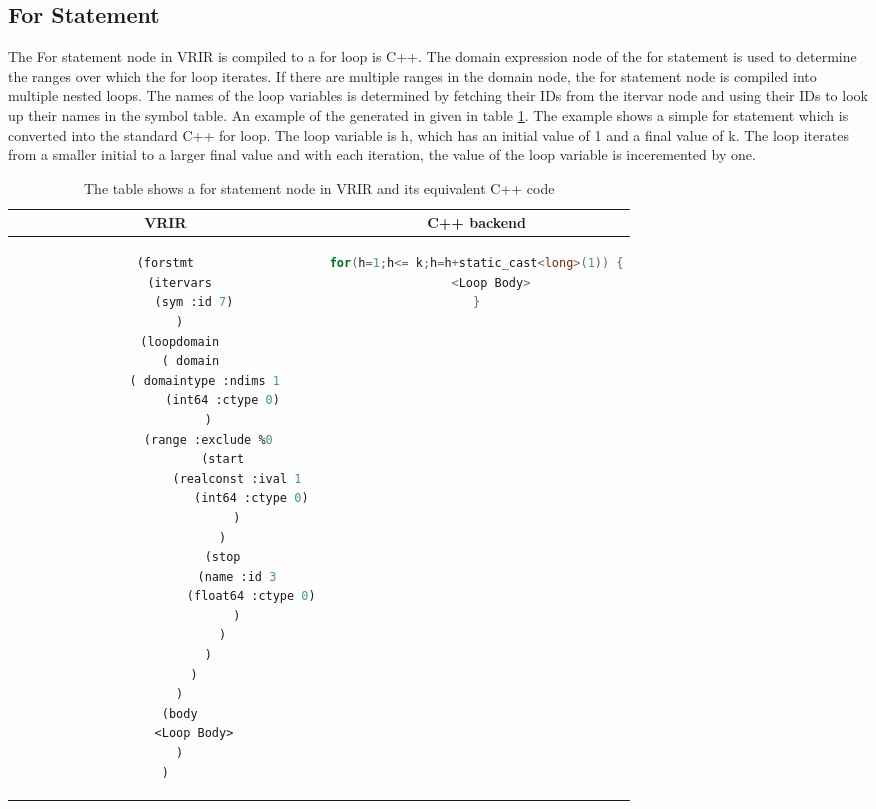 \subsection{For Statement}
\label{subsec:forStmt}
The For statement node in VRIR is compiled to a for loop is C++. The domain expression node of the for statement is used to determine the ranges over which the for loop iterates. If there are multiple ranges in the domain node, the for statement node is compiled into multiple nested loops. The names of the loop variables is determined by fetching their IDs from the itervar node and using their IDs to look up their names in the symbol table. An example of the generated in given in table \ref{tab:forStmt}. The example shows a simple for statement which is converted into the standard C++ for loop. The loop variable is h, which has an initial value of 1 and a final value of k. The loop iterates from a smaller initial to a larger final value and with each iteration, the value of the loop variable is inceremented by one. 
\begin{table}[htbp]
\begin{tabular}{|c|c|}
\hline 
VRIR & C++ backend \\
\hline 
{
\begin{lstlisting}[language=lisp, frame=none, numbers=none]
(forstmt
	(itervars
		(sym :id 7)
	)
	(loopdomain
		( domain 
			( domaintype :ndims 1 
				(int64 :ctype 0)
			)
			(range :exclude %0
				(start
					(realconst :ival 1
						(int64 :ctype 0)
					)
				)
				(stop
					(name :id 3
						(float64 :ctype 0)
					)
				)
			)
		)
	)
	(body
		<Loop Body>
	)
)

\end{lstlisting}
} & 
{
\begin{lstlisting}[language=c,frame=none, numbers=none]
for(h=1;h<= k;h=h+static_cast<long>(1)) {
	<Loop Body>
}
\end{lstlisting}
} \\
\hline
\end{tabular}
\caption[For Statement]{The table shows a for statement node in VRIR and its equivalent C++ code}
\label{tab:forStmt}
\end{table}

